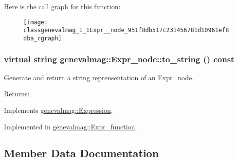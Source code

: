 Here is the call graph for this function:\nopagebreak
\begin{figure}[H]
\begin{center}
\leavevmode
\texttt{[image: classgenevalmag\_1\_1Expr\_\_node\_951f8db517c231456781d10961ef8dba\_cgraph]}
\end{center}
\end{figure}
\hypertarget{classgenevalmag_1_1Expr__node_dea1d8fbc1b01f018e18cedad871f6a7}{
\subsubsection[{to\_\-string}]{\setlength{\rightskip}{0pt plus 5cm}virtual string genevalmag::Expr\_\-node::to\_\-string () const}}
\label{classgenevalmag_1_1Expr__node_dea1d8fbc1b01f018e18cedad871f6a7}


Generate and return a string reprensentation of an \hyperlink{classgenevalmag_1_1Expr__node}{Expr\_\-node}. \begin{Desc}
\item[Returns:]\end{Desc}


Implements \hyperlink{classgenevalmag_1_1Expression_8685f44429501da942b1fe76880af6fe}{genevalmag::Expression}.

Implemented in \hyperlink{classgenevalmag_1_1Expr__function_daaebd5427337bb2288c47a16af804d8}{genevalmag::Expr\_\-function}.

\subsection{Member Data Documentation}
\hypertarget{classgenevalmag_1_1Expr__node_1fe0e44817e6f3ac688333e1714b31a3}{
\subsubsection[{childs}]{}}
\label{classgenevalmag_1_1Expr__node_1fe0e44817e6f3ac688333e1714b31a3}


